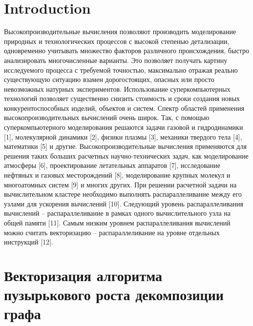 \documentclass[
11pt,%
tightenlines,%
twoside,%
onecolumn,%
nofloats,%
nobibnotes,%
nofootinbib,%
superscriptaddress,%
noshowpacs,%
centertags]%
{revtex4}
\begin{document}


\maketitle


\section{Introduction}

Высокопроизводительные вычисления позволяют производить моделирование природных и технологических процессов с высокой степенью детализации, одновременно учитывать множество факторов различного происхождения, быстро анализировать многочисленные варианты.
Это позволяет получать картину исследуемого процесса с требуемой точностью, максимально отражая реально существующую ситуацию взамен дорогостоящих, опасных или просто невозможных натурных экспериментов.
Использование суперкомпьютерных технологий позволяет существенно снизить стоимость и сроки создания новых конкурентоспособных изделий, объектов и систем.
Спектр областей применения высокопроизводительных вычислений очень широк.
Так, с помощью суперкомпьютерного моделирования решаются задачи газовой и гидродинамики [1], молекулярной динамики [2], физики плазмы [3], механики твердого тела [4], математики [5] и другие.
Высокопроизводительные вычисления применяются для решения таких больших расчетных научно-технических задач, как моделирование атмосферы [6], проектирование летательных аппаратов [7], исследование нефтяных и газовых месторождений [8], моделирование крупных молекул и многоатомных систем [9] и многих других.
При решении расчетной задачи на вычислительном кластере необходимо выполнять распараллеливание между его узлами для ускорения вычислений [10].
Следующий уровень распараллеливания вычислений -- распараллеливание в рамках одного вычислительного узла на общей памяти [11].
Самым низким уровнем распараллеливания вычислений можно считать векторизацию – распараллеливание на уровне отдельных инструкций [12].

\section{Векторизация алгоритма пузырькового роста декомпозиции графа}
\end{document}
